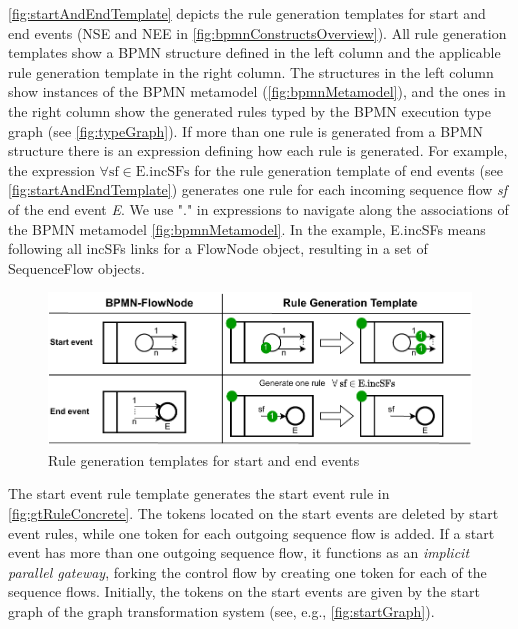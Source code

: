 \documentclass[runningheads]{llncs}
\begin{document}
\autoref{fig:startAndEndTemplate} depicts the rule generation templates for start and end events (\textsf{NSE} and \textsf{NEE} in \autoref{fig:bpmnConstructsOverview}).
All rule generation templates show a BPMN structure defined in the left column and the applicable rule generation template in the right column.
The structures in the left column show instances of the BPMN metamodel (\autoref{fig:bpmnMetamodel}), and the ones in the right column show the generated rules typed by the BPMN execution type graph (see \autoref{fig:typeGraph}).
If more than one rule is generated from a BPMN structure there is an expression defining how each rule is generated.
For example, the expression $\forall \text{sf} \in \text{E.incSFs}$ for the rule generation template of end events (see \autoref{fig:startAndEndTemplate}) generates one rule for each incoming sequence flow \textit{sf} of the end event \textit{E}.
We use "." in expressions to navigate along the associations of the BPMN metamodel \autoref{fig:bpmnMetamodel}.
In the example, \textsf{E.incSFs} means following all \textsf{incSFs} links for a \textsf{FlowNode} object, resulting in a set of \textsf{SequenceFlow} objects.



\begin{figure}[ht]
    \centering
    \includegraphics[width=.9\textwidth]{images/start_end_template.pdf}
    \caption{Rule generation templates for start and end events}
    \label{fig:startAndEndTemplate}
\end{figure}

The start event rule template generates the start event rule in \autoref{fig:gtRuleConcrete}.
The tokens located on the start events are deleted by start event rules, while one token for each outgoing sequence flow is added.
If a start event has more than one outgoing sequence flow, it functions as an \textit{implicit parallel gateway}, forking the control flow by creating one token for each of the sequence flows.
Initially, the tokens on the start events are given by the start graph of the graph transformation system (see, e.g., \autoref{fig:startGraph}).
    
\end{document}
